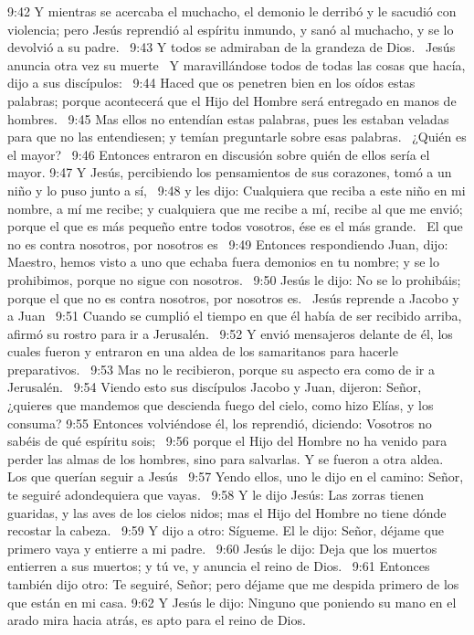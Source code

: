 9:42 Y mientras se acercaba el muchacho, el demonio le derribó y le sacudió con violencia; pero Jesús reprendió al espíritu inmundo, y sanó al muchacho, y se lo devolvió a su padre.  
9:43 Y todos se admiraban de la grandeza de Dios.  Jesús anuncia otra vez su muerte   
Y maravillándose todos de todas las cosas que hacía, dijo a sus discípulos:  
9:44 Haced que os penetren bien en los oídos estas palabras; porque acontecerá que el Hijo del Hombre será entregado en manos de hombres.  
9:45 Mas ellos no entendían estas palabras, pues les estaban veladas para que no las entendiesen; y temían preguntarle sobre esas palabras. 
¿Quién es el mayor?   
9:46 Entonces entraron en discusión sobre quién de ellos sería el mayor. 
9:47 Y Jesús, percibiendo los pensamientos de sus corazones, tomó a un niño y lo puso junto a sí,  
9:48 y les dijo: Cualquiera que reciba a este niño en mi nombre, a mí me recibe; y cualquiera que me recibe a mí, recibe al que me envió; porque el que es más pequeño entre todos vosotros, ése es el más grande.  
El que no es contra nosotros, por nosotros es  
9:49 Entonces respondiendo Juan, dijo: Maestro, hemos visto a uno que echaba fuera demonios en tu nombre; y se lo prohibimos, porque no sigue con nosotros.  
9:50 Jesús le dijo: No se lo prohibáis; porque el que no es contra nosotros, por nosotros es.  
Jesús reprende a Jacobo y a Juan  
9:51 Cuando se cumplió el tiempo en que él había de ser recibido arriba, afirmó su rostro para ir a Jerusalén.  
9:52 Y envió mensajeros delante de él, los cuales fueron y entraron en una aldea de los samaritanos para hacerle preparativos.  
9:53 Mas no le recibieron, porque su aspecto era como de ir a Jerusalén.  
9:54 Viendo esto sus discípulos Jacobo y Juan, dijeron: Señor, ¿quieres que mandemos que descienda fuego del cielo, como hizo Elías, y los consuma? 
9:55 Entonces volviéndose él, los reprendió, diciendo: Vosotros no sabéis de qué espíritu sois;  
9:56 porque el Hijo del Hombre no ha venido para perder las almas de los hombres, sino para salvarlas. Y se fueron a otra aldea.  
Los que querían seguir a Jesús   
9:57 Yendo ellos, uno le dijo en el camino: Señor, te seguiré adondequiera que vayas.  
9:58 Y le dijo Jesús: Las zorras tienen guaridas, y las aves de los cielos nidos; mas el Hijo del Hombre no tiene dónde recostar la cabeza.  
9:59 Y dijo a otro: Sígueme. El le dijo: Señor, déjame que primero vaya y entierre a mi padre.  
9:60 Jesús le dijo: Deja que los muertos entierren a sus muertos; y tú ve, y anuncia el reino de Dios.  
9:61 Entonces también dijo otro: Te seguiré, Señor; pero déjame que me despida primero de los que están en mi casa. 
9:62 Y Jesús le dijo: Ninguno que poniendo su mano en el arado mira hacia atrás, es apto para el reino de Dios.  
